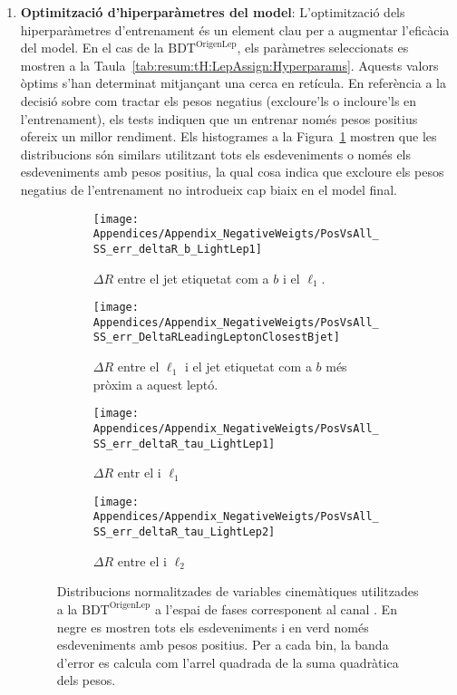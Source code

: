 \begin{enumerate}
	
	
 	\item \textbf{Optimització d'hiperparàmetres del model}: L'optimització dels hiperparàmetres d'entrenament és 
	un element clau per a augmentar l'eficàcia del model. En el cas de la $\text{BDT}^{\text{OrigenLep}}$, els paràmetres 
	seleccionats es mostren a la Taula~\ref{tab:resum:tH:LepAssign:Hyperparams}. Aquests valors òptims s'han 
	determinat mitjançant una cerca en retícula. En referència a la decisió sobre com tractar els pesos negatius 
	(excloure'ls o incloure'ls en l'entrenament), els tests indiquen que un entrenar només pesos positius ofereix un millor 
	rendiment. Els histogrames a la Figura~\ref{fig:Resum:NegWeights:Distributions} mostren que les distribucions 
	són similars utilitzant tots els esdeveniments o només els esdeveniments amb pesos positius, la qual cosa indica que 
	excloure els pesos negatius de l'entrenament no introdueix cap biaix en el model final.	
	
	
	\begin{figure}
\centering
\begin{subfigure}{.44\textwidth}
  \centering
  \texttt{[image: Appendices/Appendix\_NegativeWeigts/PosVsAll\_SS\_err\_deltaR\_b\_LightLep1]}
  \caption{$\Delta R$ entre el jet etiquetat com a $b$ i el $\ell_{1}$.}
\end{subfigure}%
\begin{subfigure}{.44\textwidth}
  \centering
  \texttt{[image: Appendices/Appendix\_NegativeWeigts/PosVsAll\_SS\_err\_DeltaRLeadingLeptonClosestBjet]}
  \caption{$\Delta R$ entre el $\ell_{1}$ i el  jet etiquetat com a $b$ més pròxim a aquest leptó.}
\end{subfigure} \hfill%

\begin{subfigure}{.44\textwidth}
  \centering
  \texttt{[image: Appendices/Appendix\_NegativeWeigts/PosVsAll\_SS\_err\_deltaR\_tau\_LightLep1]}
  \caption{$\Delta R$ entr el \tauhad i $\ell_{1}$}
\end{subfigure}%
\begin{subfigure}{.44\textwidth}
  \centering
  \texttt{[image: Appendices/Appendix\_NegativeWeigts/PosVsAll\_SS\_err\_deltaR\_tau\_LightLep2]}
  \caption{$\Delta R$ entre el \tauhad i $\ell_{2}$}
\end{subfigure}%
\caption{Distribucions normalitzades de variables cinemàtiques utilitzades a la $\text{BDT}^{\text{OrigenLep}}$ a l'espai de fases
corresponent al canal \dilepSStau. En negre es mostren tots els esdeveniments i en verd només esdeveniments amb pesos positius.
Per a cada bin, la banda d'error es calcula com l'arrel quadrada de la suma quadràtica dels pesos.}
\label{fig:Resum:NegWeights:Distributions}
\end{figure}
	

\end{enumerate}
